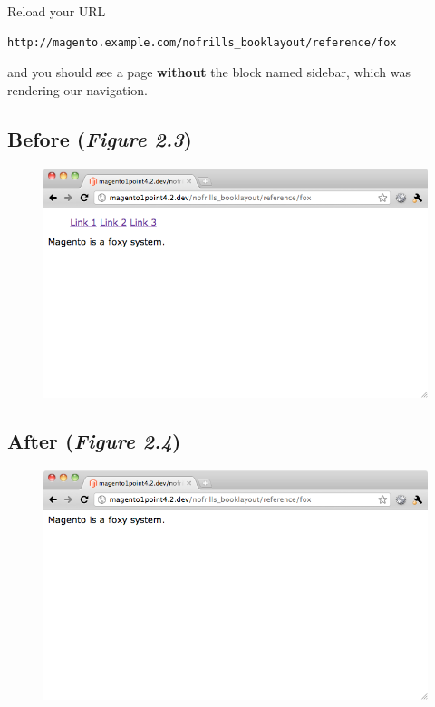 \documentclass[oneside]{book}
\begin{document}
Reload your URL

\begin{lstlisting}
http://magento.example.com/nofrills_booklayout/reference/fox

\end{lstlisting}


and you should see a page \textbf{without} the block named sidebar, which was rendering our navigation.

\subsection{Before (\emph{Figure 2.3})}

\begin{figure}[htb]
\begin{center}
\leavevmode
\includegraphics[width=1\textwidth]{images/chapter2/before.png}
\end{center}
\caption{}
\end{figure}


\subsection{After (\emph{Figure 2.4})}

\begin{figure}[htb]
\begin{center}
\leavevmode
\includegraphics[width=1\textwidth]{images/chapter2/after.png}
\end{center}
\caption{}
\end{figure}
\end{document}
